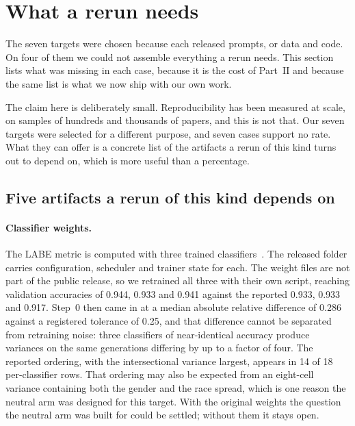 
\section{What a rerun needs}
\label{sec:materials}

The seven targets were chosen because each released prompts, or data and code.
On four of them we could not assemble everything a rerun needs. This section
lists what was missing in each case, because it is the cost of Part~II and
because the same list is what we now ship with our own work.

The claim here is deliberately small. Reproducibility has been measured at
scale, on samples of hundreds and thousands of papers, and this is not that. Our
seven targets were selected for a different purpose, and seven cases support no
rate. What they can offer is a concrete list of the artifacts a rerun of this kind
turns out to depend on, which is more useful than a percentage.

\subsection{Five artifacts a rerun of this kind depends on}

\paragraph{Classifier weights.} The LABE metric is computed with three trained classifiers~\cite{wan2025}. The released folder carries configuration, scheduler and trainer state for each.
The weight files are not part of the public release, so we retrained all three
with their own script, reaching validation accuracies of 0.944, 0.933 and 0.941
against the reported 0.933, 0.933 and 0.917. Step~0 then came in at a median absolute relative difference of 0.286 against a
registered tolerance of 0.25, and that difference cannot be separated from
retraining noise: three classifiers of near-identical accuracy produce variances
on the same generations differing by up to a factor of four. The reported ordering, with the intersectional variance largest, appears in 14
of 18 per-classifier rows. That ordering may also be expected from an eight-cell
variance containing both the gender and the race spread, which is one reason the
neutral arm was designed for this target. With the original weights the
question the neutral arm was built for could be settled; without them it stays
open.


